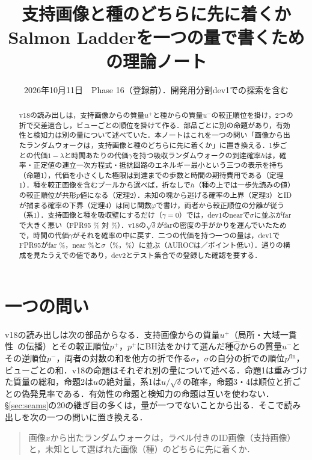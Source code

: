 \documentclass[a4paper,10pt,dvipdfmx]{jsarticle}
\title{支持画像と種のどちらに先に着くか\\[3pt]{\large Salmon Ladderを一つの量で書くための理論ノート}}
\author{}
\date{2026年10月11日　Phase 16（登録前）．開発用分割dev1での探索を含む}
\theoremstyle{definition}
\newcommand{\hQ}{\hat{Q}}
\newcommand{\AUC}{AUROC}
\newcommand{\FPR}{FPR95}
\newcommand{\pP}{p^{+}}
\newcommand{\pN}{p^{-}}
\newcommand{\pfin}{p^{\mathrm{fin}}}
\begin{document}
\maketitle
\begin{abstract}
v18の読み出しは，支持画像からの質量$u^{+}$と種からの質量$u^{-}$の較正順位を掛け，2つの折で交差適合し，ビューごとの順位を掛けて作る．部品ごとに別の命題があり，有効性と検知力は別の量について述べていた．本ノートはこれを一つの問い「画像から出たランダムウォークは，支持画像と種のどちらに先に着くか」に置き換える．1歩ごとの代価$1-\lambda$と時間あたりの代価$\gamma$を持つ吸収ランダムウォークの到達確率$h$は，確率・正定値の連立一次方程式・抵抗回路のエネルギー最小という三つの表示を持ち（命題1），代価を小さくした極限は到達までの歩数と時間の期待費用である（定理1）．種を較正画像を含むプールから選べば，折なしで$h$（種の上では一歩先読みの値）の較正順位が共形$p$値になる（定理2）．未知の塊から逃げる確率の上界（定理3）とIDが捕まる確率の下界（定理4）は同じ関数$\varphi$で書け，両者から較正順位の分離が従う（系1）．支持画像と種を吸収壁にするだけ（$\gamma{=}0$）では，dev1のnearで$\sigma$に並ぶがfarで大きく悪い（\FPR{} \NAbsOneFar\% 対 \NSigFar\%）．v18の$\sqrt{\delta}$がfarの密度の手がかりを運んでいたためで，時間の代価$\gamma$がそれを確率の中に戻す．二つの代価を持つ一つの量は，dev1で\FPR{}がfar \NFinFar\%，near \NFinNear\%と$\sigma$（\NSigFar\%，\NSigNear\%）に並ぶ（\AUC{}は\NFinAucGapFar{}／\NFinAucGapNear{}ポイント低い）．\NNCfg{}通りの構成を見たうえでの値であり，dev2とテスト集合での登録した確認を要する．
\end{abstract}

\section{一つの問い}
v18の読み出しは次の部品からなる．支持画像からの質量$u^{+}$（局所・大域一貫性~\cite{zhou2004lgc}の伝播）とその較正順位$\pP$，$\pP$にBH法をかけて選んだ種$\hQ$からの質量$u^{-}$とその逆順位$\pN$，両者の対数の和を他方の折で作る$\sigma$，$\sigma$の自分の折での順位$\pfin$，ビューごとの和．v18の命題はそれぞれ別の量について述べる．命題1は重みづけた質量の総和，命題2は$u$の絶対量，系1は$u/\sqrt{\delta}$の確率，命題3・4は順位と折ごとの偽発見率である．有効性の命題と検知力の命題は互いを使わない．\S\ref{sec:seams}の20の継ぎ目の多くは，量が一つでないことから出る．そこで読み出しを次の一つの問いに置き換える．
\begin{quote}
画像$x$から出たランダムウォークは，ラベル付きのID画像（支持画像）と，未知として選ばれた画像（種）のどちらに先に着くか．
\end{quote}
\end{document}
